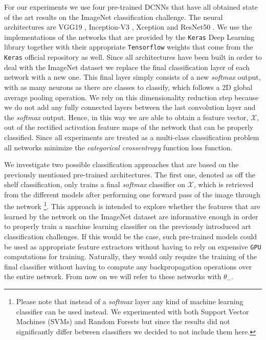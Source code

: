 For our experiments we use four pre-trained DCNNs that have all obtained state of the art results on the ImageNet classification challenge. The neural architectures are VGG19 \cite{simonyan2014very}, Inception-V3 \cite{szegedy2016rethinking}, Xception \cite{chollet2016xception} and ResNet50 \cite{xie2017aggregated}. We use the implementations of the networks that are provided by the \texttt{Keras} Deep Learning library \cite{chollet2015keras} together with their appropriate \texttt{Tensorflow} weights \cite{abadi2016tensorflow} that come from the \texttt{Keras} official repository as well. Since all architectures have been built in order to deal with the ImageNet dataset we replace the final classification layer of each network with a new one. This final layer simply consists of a new \textit{softmax} output, with as many neurons as there are classes to classify, which follows a 2D global average pooling operation. We rely on this dimensionality reduction step because we do not add any fully connected layers between the last convolution layer and the \textit{softmax} output. Hence, in this way we are able to obtain a feature vector, $\mathscr{X}$, out of the rectified activation feature maps of the network that can be properly classified. Since all experiments are treated as a multi-class classification problem all networks minimize the \textit{categorical crossentropy} function loss function.

We investigate two possible classification approaches that are based on the previously mentioned pre-trained architectures. The first one, denoted as off the shelf classification, only trains a final \textit{softmax} classifier on $\mathscr{X}$, which is retrieved from the different models after performing one forward pass of the image through the network \footnote{Please note that instead of a \textit{softmax} layer any kind of machine learning classifier can be used instead. We experimented with both Support Vector Machines (SVMs) and Random Forests but since the results did not significantly differ between classifiers we decided to not include them here.}. This approach is intended to explore whether the features that are learned by the network on the ImageNet dataset are informative enough in order to properly train a machine learning classifier on the previously introduced art classification challenges. If this would be the case, such pre-trained models could be used as appropriate feature extractors without having to rely on expensive \texttt{GPU} computations for training. Naturally, they would only require the training of the final classifier without having to compute any backpropagation operations over the entire network. From now on we will refer to these networks with $\theta_{-}$. 

